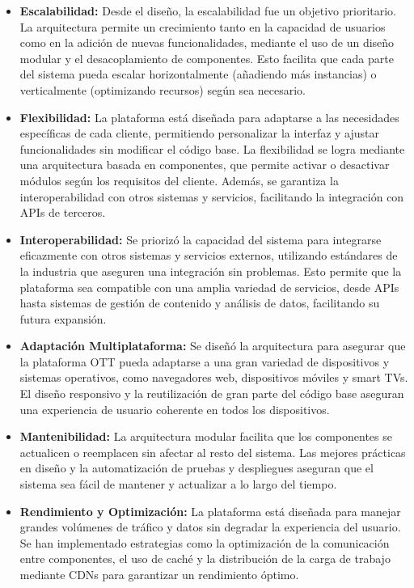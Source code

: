 \begin{itemize}
    \item \textbf{Escalabilidad:} Desde el diseño, la escalabilidad fue un objetivo prioritario. 
    La arquitectura permite un crecimiento tanto en la capacidad de usuarios como en la adición de nuevas funcionalidades, 
    mediante el uso de un diseño modular y el desacoplamiento de componentes. Esto facilita que cada parte del sistema 
    pueda escalar horizontalmente (añadiendo más instancias) o verticalmente (optimizando recursos) según sea necesario.

    \item \textbf{Flexibilidad:} La plataforma está diseñada para adaptarse a las necesidades específicas de cada cliente, 
    permitiendo personalizar la interfaz y ajustar funcionalidades sin modificar el código base. La flexibilidad se logra 
    mediante una arquitectura basada en componentes, que permite activar o desactivar módulos según los requisitos del cliente. 
    Además, se garantiza la interoperabilidad con otros sistemas y servicios, facilitando la integración con APIs de terceros.

    \item \textbf{Interoperabilidad:} Se priorizó la capacidad del sistema para integrarse eficazmente con otros sistemas 
    y servicios externos, utilizando estándares de la industria que aseguren una integración sin problemas. Esto permite 
    que la plataforma sea compatible con una amplia variedad de servicios, desde APIs hasta sistemas de gestión de contenido 
    y análisis de datos, facilitando su futura expansión.

    \item \textbf{Adaptación Multiplataforma:} Se diseñó la arquitectura para asegurar que la plataforma OTT pueda adaptarse 
    a una gran variedad de dispositivos y sistemas operativos, como navegadores web, dispositivos móviles y smart TVs. 
    El diseño responsivo y la reutilización de gran parte del código base aseguran una experiencia de usuario coherente 
    en todos los dispositivos.

    \item \textbf{Mantenibilidad:} La arquitectura modular facilita que los componentes se actualicen o reemplacen sin 
    afectar al resto del sistema. Las mejores prácticas en diseño y la automatización de pruebas y despliegues aseguran 
    que el sistema sea fácil de mantener y actualizar a lo largo del tiempo.

    \item \textbf{Rendimiento y Optimización:} La plataforma está diseñada para manejar grandes volúmenes de tráfico y datos 
    sin degradar la experiencia del usuario. Se han implementado estrategias como la optimización de la comunicación entre 
    componentes, el uso de caché y la distribución de la carga de trabajo mediante CDNs para garantizar un rendimiento óptimo.


\end{itemize}

